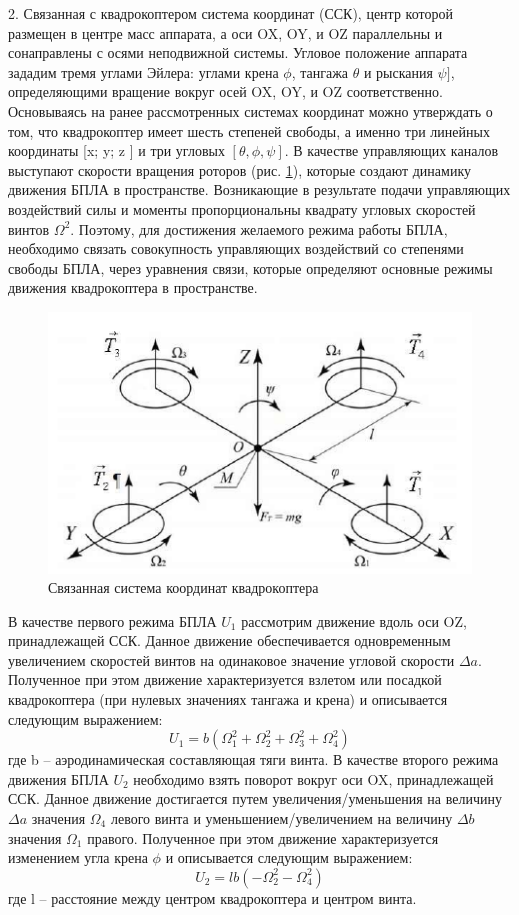 2. Связанная с квадрокоптером система координат (ССК), центр которой размещен в центре масс аппарата, а оси OX, OY, и OZ параллельны и сонаправлены с осями неподвижной системы. Угловое положение аппарата зададим тремя углами Эйлера: углами крена \(\phi\), тангажа \(\theta\) и рыскания \(\psi]\), определяющими вращение вокруг осей OX, OY, и OZ соответственно. Основываясь на ранее рассмотренных системах координат можно утверждать о том, что квадрокоптер имеет шесть степеней свободы, а именно три линейных координаты [x; y; z ] и три угловых \([\theta, \phi, \psi]\). В качестве управляющих каналов выступают скорости вращения роторов (рис. \ref{fig:ris1}), которые создают динамику движения БПЛА в пространстве. Возникающие в результате подачи управляющих воздействий силы и моменты пропорциональны квадрату угловых скоростей винтов \(\Omega^2\). Поэтому, для достижения желаемого режима работы БПЛА, необходимо связать совокупность управляющих воздействий со степенями свободы БПЛА, через уравнения связи, которые определяют основные режимы движения квадрокоптера в пространстве.
\begin{figure}[H]
	\centering
	\includegraphics[width=0.5\linewidth]{pics/ris1}
	\caption{Связанная система координат квадрокоптера
	}
	\label{fig:ris1}
\end{figure}
В качестве первого режима БПЛА \(U_{1}\) рассмотрим движение вдоль оси OZ, принадлежащей ССК. Данное движение обеспечивается одновременным увеличением скоростей винтов на одинаковое значение угловой скорости \(\Delta a\). Полученное при этом движение характеризуется взлетом или посадкой квадрокоптера (при нулевых значениях тангажа и крена) и описывается следующим выражением:
\begin{equation}
U_{1}=b(\Omega_{1}^2+\Omega_{2}^2+\Omega_{3}^2+\Omega_{4}^2)
\end{equation}
где b – аэродинамическая составляющая тяги винта.
В качестве второго режима движения БПЛА \(U_{2}\) необходимо взять поворот вокруг оси OX, принадлежащей ССК. Данное движение достигается путем увеличения/уменьшения на величину \(\Delta a\) значения \(\Omega_{4}\) левого винта и уменьшением/увеличением на величину \(\Delta b\) значения \(\Omega_{1}\)
правого. Полученное при этом движение характеризуется изменением угла крена \(\phi\) и описывается следующим выражением:
\begin{equation}
U_{2}=lb(-\Omega_{2}^2-\Omega_{4}^2)
\end{equation}
где l – расстояние между центром квадрокоптера и центром винта.

